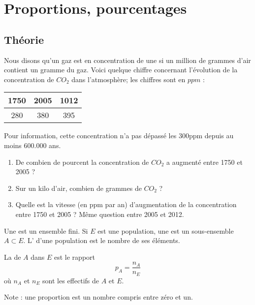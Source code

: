 
\chapter{Proportions, pourcentages}

\section{Théorie}

Nous disons qu'un gaz est en concentration de une  si un million de grammes d'air contient un gramme du gaz. Voici quelque chiffre concernant l'évolution de la concentration de \( CO_2\) dans l'atmosphère; les chiffres sont en \( \unit{}{ppm}\) :
\begin{center}
\begin{tabular}{|c|c|c|}
    \hline
    1750    &   2005    &   1012\\
    \hline
    280&380&395\\
    \hline
\end{tabular}
\end{center}
Pour information, cette concentration n'a pas dépassé les \unit{300}{ppm} depuis au moins \( 600.000\) ans.

\begin{enumerate}
    \item
        De combien de pourcent la concentration de \( CO_2\) a augmenté entre 1750 et 2005 ?
    \item
        Sur un kilo d'air, combien de grammes de \( CO_2\) ?
    \item 
        Quelle est la vitesse (en ppm par an) d'augmentation de la concentration entre 1750 et 2005 ? Même question entre 2005 et 2012.
\end{enumerate}

\begin{definition}
    Une  est un ensemble fini. Si \( E\) est une population, une  est un sous-ensemble \( A\subset E\). L' d'une population est le nombre de ses éléments.

    La  de \( A\) dans \( E\) est le rapport
    \begin{equation}
        p_A=\frac{ n_A }{ n_E }
    \end{equation}
    où \( n_A\) et \( n_E\) sont les effectifs de \( A\) et \( E\).
\end{definition}
Note : une proportion est un nombre compris entre zéro et un.


